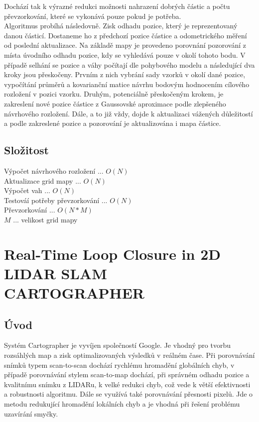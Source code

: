\documentclass[11pt]{article}
\begin{document}
Dochází tak k výrazné redukci možnosti nahrazení dobrých částic a počtu převzorkování, které se vykonává pouze pokud je potřeba.\\
\indent Algoritmus probíhá následovně. Zisk odhadu pozice, který je reprezentovaný danou částicí. Dostaneme ho z předchozí pozice částice a odometrického měření od poslední aktualizace. Na základě mapy je provedeno porovnání pozorování z místa úvodního odhadu pozice, kdy se vyhledává pouze v okolí tohoto bodu. V případě selhání se pozice a váhy počítají dle pohybového modelu a následující dva kroky jsou přeskočeny. Prvním z nich vybrání sady vzorků v okolí dané pozice, vypočítání průměrů a kovarianční matice návrhu bodovým hodnocením cílového rozložení v pozici vzorku. Druhým, potenciálně přeskočeným krokem, je zakreslení nové pozice částice z Gaussovské aproximace podle zlepšeného návrhového rozložení. Dále, a to již vždy, dojde k aktualizaci vážených důležitostí a podle zakreslené pozice a pozorování je aktualizována i mapa částice. 
 
\subsection{Složitost}
Výpočet návrhového rozložení ... $O(N)$\\
Aktualizace grid mapy ... $O(N)$\\
Výpočet vah ... $O(N)$\\
Testováí potřeby převzorkování ... $O(N)$\\
Převzorkování ... $O(N*M)$\\
$M$ ... velikost grid mapy\\



\newpage

\section{Real-Time Loop Closure in 2D LIDAR SLAM \\ CARTOGRAPHER}

\subsection{Úvod}
Systém Cartographer je vyvíjen společností Google. Je vhodný pro tvorbu rozsáhlých map a zisk optimalizovaných výsledků v reálném čase. Při porovnávání snímků typem scan-to-scan dochází rychlému hromadění globálních chyb, v případě porovnávání stylem scan-to-map dochází, při správném odhadu pozice a kvalitnímu snímku z LIDARu, k velké redukci chyb, což vede k větší efektivnosti a robustnosti algoritmu. Dále se využívá také porovnávání přesnosti pixelů. Jde o metodu redukující hromadění lokálních chyb a je vhodná při řešení problému uzavírání smyčky. \\
\end{document}
